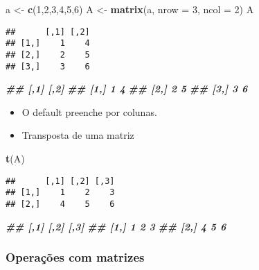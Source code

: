\documentclass[
]{article}
\newenvironment{Shaded}{\begin{snugshade}}{\end{snugshade}}
\newcommand{\AttributeTok}[1]{\textcolor[rgb]{0.13,0.29,0.53}{#1}}
\newcommand{\DecValTok}[1]{\textcolor[rgb]{0.00,0.00,0.81}{#1}}
\newcommand{\DocumentationTok}[1]{\textcolor[rgb]{0.56,0.35,0.01}{\textbf{\textit{#1}}}}
\newcommand{\FunctionTok}[1]{\textcolor[rgb]{0.13,0.29,0.53}{\textbf{#1}}}
\newcommand{\NormalTok}[1]{#1}
\newcommand{\OtherTok}[1]{\textcolor[rgb]{0.56,0.35,0.01}{#1}}
\providecommand{\tightlist}{%
  \setlength{\itemsep}{0pt}\setlength{\parskip}{0pt}}
\begin{document}
\begin{Shaded}
\begin{Highlighting}[]
\NormalTok{a }\OtherTok{\textless{}{-}} \FunctionTok{c}\NormalTok{(}\DecValTok{1}\NormalTok{,}\DecValTok{2}\NormalTok{,}\DecValTok{3}\NormalTok{,}\DecValTok{4}\NormalTok{,}\DecValTok{5}\NormalTok{,}\DecValTok{6}\NormalTok{)}
\NormalTok{A }\OtherTok{\textless{}{-}} \FunctionTok{matrix}\NormalTok{(a, }\AttributeTok{nrow =} \DecValTok{3}\NormalTok{, }\AttributeTok{ncol =} \DecValTok{2}\NormalTok{)}
\NormalTok{A}
\end{Highlighting}
\end{Shaded}

\begin{verbatim}
##      [,1] [,2]
## [1,]    1    4
## [2,]    2    5
## [3,]    3    6
\end{verbatim}

\begin{Shaded}
\begin{Highlighting}[]
\DocumentationTok{\#\# [,1] [,2]}
\DocumentationTok{\#\# [1,] 1 4}
\DocumentationTok{\#\# [2,] 2 5}
\DocumentationTok{\#\# [3,] 3 6}
\end{Highlighting}
\end{Shaded}

\begin{itemize}
\tightlist
\item
  O default preenche por colunas.
\item
  Transposta de uma matriz
\end{itemize}

\begin{Shaded}
\begin{Highlighting}[]
\FunctionTok{t}\NormalTok{(A)}
\end{Highlighting}
\end{Shaded}

\begin{verbatim}
##      [,1] [,2] [,3]
## [1,]    1    2    3
## [2,]    4    5    6
\end{verbatim}

\begin{Shaded}
\begin{Highlighting}[]
\DocumentationTok{\#\# [,1] [,2] [,3]}
\DocumentationTok{\#\# [1,] 1 2 3}
\DocumentationTok{\#\# [2,] 4 5 6}
\end{Highlighting}
\end{Shaded}

\hypertarget{operauxe7uxf5es-com-matrizes}{%
\subsubsection{Operações com
matrizes}\label{operauxe7uxf5es-com-matrizes}}
\end{document}
